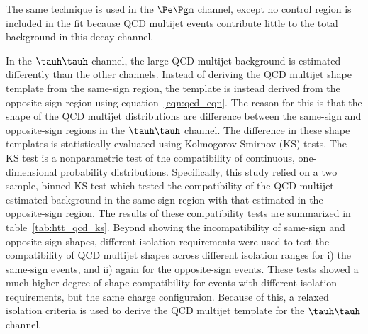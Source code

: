 The same technique is used in the $\Pe\Pgm$ channel, except no control region is included in the 
fit because QCD multijet events contribute little to the total background in this decay channel.


In the $\tauh\tauh$ channel, the large QCD multijet background is estimated differently than
the other channels. Instead of deriving the QCD multijet shape template from the same-sign
region, the template is instead derived from the opposite-sign region using 
equation~\ref{eqn:qcd_eqn}. The reason for this is that the shape of the QCD multijet
distributions are difference between the same-sign and opposite-sign regions in the
$\tauh\tauh$ channel. The difference in these shape templates is statistically
evaluated using Kolmogorov-Smirnov (KS) tests. The KS test is a nonparametric test of the compatibility
of continuous, one-dimensional probability distributions. Specifically, this study relied
on a two sample, binned KS test which tested the compatibility of the QCD multijet
estimated background in the same-sign region with that estimated in the opposite-sign region.
The results of these compatibility tests are summarized in table~\ref{tab:htt_qcd_ks}.
Beyond showing the incompatibility of same-sign and opposite-sign shapes, different
isolation requirements were used to test the compatibility of QCD multijet shapes
across different isolation ranges for i) the same-sign events, and ii) again for the
opposite-sign events. These tests showed a much higher degree of shape compatibility
for events with different isolation requirements, but the same charge configuraion.
Because of this, a relaxed isolation criteria is used to derive the QCD multijet
template for the $\tauh\tauh$ channel.

